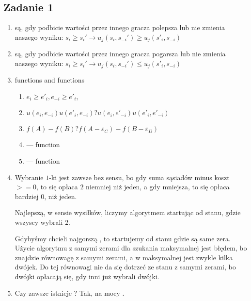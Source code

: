 \subsection{Zadanie 1}
\begin{enumerate}
    \item
       są, gdy podbicie wartości przez innego gracza polepsza lub nie zmienia naszego wyniku:
      $s_i \geq s_i' \rightarrow u_j(s_i, s_{-i}') \geq u_j(s'_i, s_{-i})$
    \item
       są, gdy podbicie wartości przez innego gracza pogarsza lub nie zmienia naszego wyniku:
      $s_i \geq s_i' \rightarrow u_j(s_i, s_{-i}') \leq u_j(s'_i, s_{-i})$
    \item
         functions and  functions
        \begin{enumerate}
            \item
                $e_i \geq e'_i, e_{-i} \geq e'_i$,
            \item
                $ u(e_i, e_{-i}) u(e'_i, e_{-i}) ?  u(e_i, e'_{-i}) u(e'_i, e'_{-i}) $
            \item
                $ f(A) - f(B) ?  f(A - \varepsilon_C) - f(B - \varepsilon_D) $
            \item
                --- function
            \item
                --- function
        \end{enumerate}
      \item
        Wybranie $1$-ki jest zawsze bez sensu, bo gdy suma sąsiadów minus koszt
        $>= 0$, to się opłaca $2$ niemniej niż jeden, a gdy mniejsza, to się
        opłaca bardziej $0$, niż jeden.

        Najlepszą, w sensie wysiłków,  liczymy
        algorytmem  startując od stanu, gdzie
        wszyscy wybrali $2$.

        Gdybyśmy chcieli najgorszą , to startujemy od
        stanu gdzie są same zera. Użycie algorytmu z samymi zerami dla szukania
        maksymalnej  jest błędem, bo znajdzie
        równowagę z samymi zerami, a w maksymalnej 
        jest zwykle kilka dwójek. Do tej równowagi nie da się dotrzeć ze stanu
        z samymi zerami, bo dwójki opłacają się, gdy inni już wybrali dwójki.

      \item
        Czy zawsze istnieje ? Tak, na mocy .
\end{enumerate}

